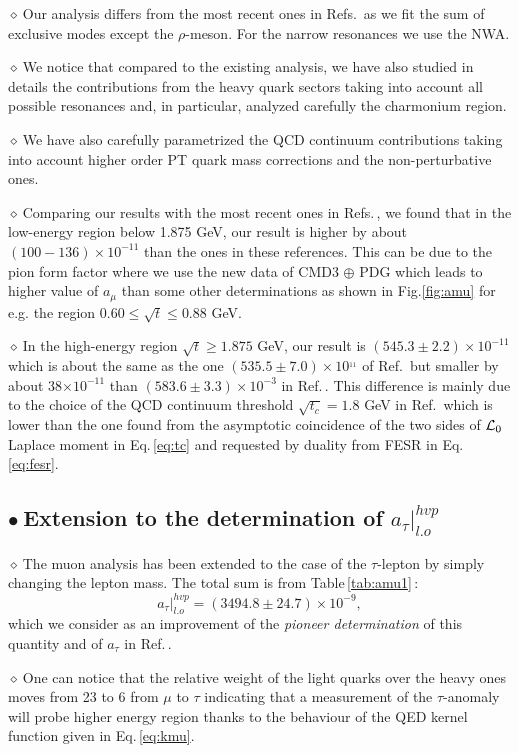 \documentclass[review]{elsarticle}
\def\beq{\begin{equation}}
\def\eeq{\end{equation}}
\def\b{$\bullet~$}
\def\d{$\diamond~$}
\begin{document}
\d Our analysis differs from the most recent ones in Refs.\,\cite{NOMURA,DAVIER2} as we fit the sum of exclusive modes except the $\rho$-meson.  For the narrow resonances we use the NWA.

\d We notice that compared to the existing analysis, we have also studied in details the contributions from the heavy quark sectors taking into account all possible resonances and, in particular, analyzed carefully the charmonium region. 

\d We have also carefully parametrized the QCD continuum contributions taking into account higher order PT quark mass corrections and the non-perturbative ones. 

\d Comparing our results with the most recent ones in Refs.\,\cite{DAVIER2,NOMURA}, we found that in the low-energy region below 1.875 GeV, our result is higher by about $(100-136)\times 10^{-11}$ than the ones in these references. This can be due to the pion form factor where we use the new data of CMD3 $\oplus$ PDG which leads to higher value of $a_\mu$ than some other determinations as shown in Fig.\ref{fig:amu} for e.g. the region $0.60\leq \sqrt{t}\leq 0.88$ GeV.

\d In the high-energy region $\sqrt{t}\geq 1.875$ GeV, our result is $(545.3\pm 2.2)\times 10^{-11}$ which is  about the same as  the one $(535.5\pm 7.0)\times 10^{_11}$ of Ref.\,\cite{NOMURA}  but smaller by about 38$\times 10^{-11}$ than $(583.6\pm 3.3)\times 10^{-3}$ in Ref.\,\cite{DAVIER2}. This difference is mainly due to  the choice of the QCD continuum threshold $\sqrt{t_c}= 1.8$ GeV in Ref.\,\cite{DAVIER2}  which is lower than the one found from the asymptotic coincidence of the two sides of ${\cal L}_0$ Laplace moment  in Eq.\,\ref{eq:tc} and requested by duality from FESR   in Eq. \ref{eq:fesr}. 

\subsection*{\b Extension to the determination of  $a_\tau\vert^{hvp}_{l.o}$} 
\d The muon analysis has been extended to the case of the $\tau$-lepton by simply changing the lepton mass. The total sum is from Table\,\ref{tab:amu1}\,:
\beq
a_\tau\vert^{hvp}_{l.o}=(3494.8\pm 24.7)\times 10^{-9},
\eeq
which we consider as an improvement of the {\it pioneer determination} of this quantity and of $a_\tau$ in Ref.\,\cite{SN78}. 

\d One can notice that the relative weight of the light quarks over the heavy ones moves from 23 to 6 from $\mu$ to $\tau$ indicating that a measurement of the $\tau$-anomaly will probe higher energy region thanks to the behaviour of the QED kernel function  given in Eq.\,\ref{eq:kmu}. 
\end{document}
